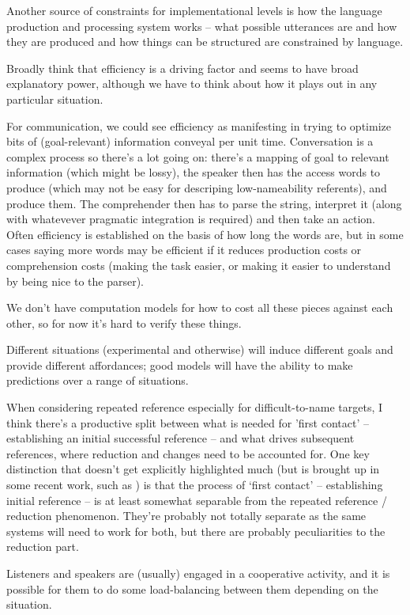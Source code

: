 \documentclass[]{article}
\begin{document}
Another source of constraints for implementational levels is how the language production and processing system works -- what possible utterances are and how they are produced and how things can be structured are constrained by language. 

Broadly think that efficiency is a driving factor and seems to have broad explanatory power, although we have to think about how it plays out in any particular situation. 

For communication, we could see efficiency as manifesting in trying to optimize bits of (goal-relevant) information conveyal per unit time. Conversation is a complex process so there's a lot going on: there's a mapping of goal to relevant information (which might be lossy), the speaker then has the access words to produce (which may not be easy for descriping low-nameability referents), and produce them. The comprehender then has to parse the string, interpret it (along with whatevever pragmatic integration is required) and then take an action. Often efficiency is established on the basis of how long the words are, but in some cases saying more words may be efficient if it reduces production costs or comprehension costs (making the task easier, or making it easier to understand by being nice to the parser). 

We don't have computation models for how to cost all these pieces against each other, so for now it's hard to verify these things. 

Different situations (experimental and otherwise) will induce different goals and provide different affordances; good models will have the ability to make predictions over a range of situations. 


When considering repeated reference especially for difficult-to-name targets, I think there's a productive split between what is needed for 'first contact' -- establishing an initial successful reference -- and what drives subsequent references, where reduction and changes need to be accounted for. One key distinction that doesn't get explicitly highlighted much (but is brought up in some recent work, such as \cite{leung2023}) is that the process of `first contact' -- establishing initial reference -- is at least somewhat separable from the repeated reference / reduction phenomenon. They're probably not totally separate as the same systems will need to work for both, but there are probably peculiarities to the reduction part. 

Listeners and speakers are (usually) engaged in a cooperative activity, and it is possible for them to do some load-balancing between them depending on the situation. 
\end{document}
